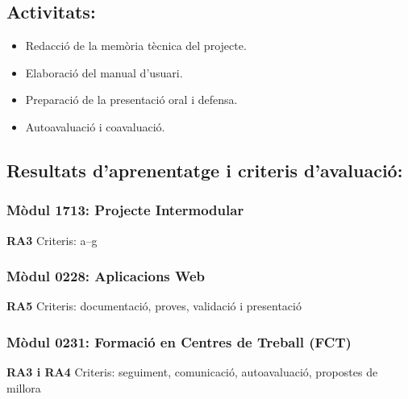 \documentclass[
  a4paper,
]{article}
\providecommand{\tightlist}{%
  \setlength{\itemsep}{0pt}\setlength{\parskip}{0pt}}
\begin{document}
\subsection{Activitats:}\label{activitats-4}

\begin{itemize}
\tightlist
\item
  Redacció de la memòria tècnica del projecte.
\item
  Elaboració del manual d'usuari.
\item
  Preparació de la presentació oral i defensa.
\item
  Autoavaluació i coavaluació.
\end{itemize}

\subsection{Resultats d'aprenentatge i criteris
d'avaluació:}\label{resultats-daprenentatge-i-criteris-davaluaciuxf3-4}

\subsubsection{Mòdul 1713: Projecte
Intermodular}\label{muxf2dul-1713-projecte-intermodular-3}

\textbf{RA3} Criteris: a--g

\subsubsection{Mòdul 0228: Aplicacions
Web}\label{muxf2dul-0228-aplicacions-web-3}

\textbf{RA5} Criteris: documentació, proves, validació i presentació

\subsubsection{Mòdul 0231: Formació en Centres de Treball
(FCT)}\label{muxf2dul-0231-formaciuxf3-en-centres-de-treball-fct-2}

\textbf{RA3 i RA4} Criteris: seguiment, comunicació, autoavaluació,
propostes de millora
\end{document}
